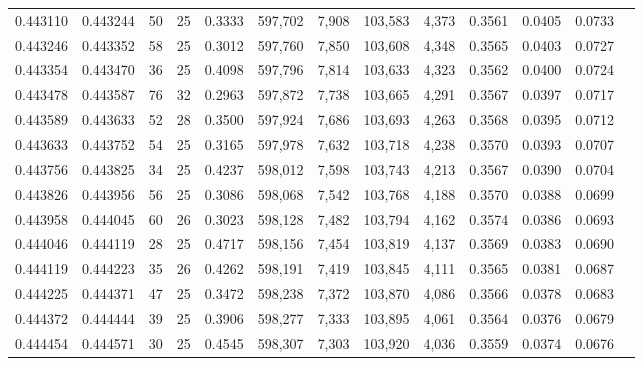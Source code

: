 \begin{tabular}{rrrrrrrrrrrrr}
0.443110 & 0.443244 &    50 &  25 &                                     0.3333 & 597,702 &   7,908 & 103,583 &   4,373 & 0.3561 & 0.0405 & 0.0733 \\
0.443246 & 0.443352 &    58 &  25 &                                     0.3012 & 597,760 &   7,850 & 103,608 &   4,348 & 0.3565 & 0.0403 & 0.0727 \\
0.443354 & 0.443470 &    36 &  25 &                                     0.4098 & 597,796 &   7,814 & 103,633 &   4,323 & 0.3562 & 0.0400 & 0.0724 \\
0.443478 & 0.443587 &    76 &  32 &                                     0.2963 & 597,872 &   7,738 & 103,665 &   4,291 & 0.3567 & 0.0397 & 0.0717 \\
0.443589 & 0.443633 &    52 &  28 &                                     0.3500 & 597,924 &   7,686 & 103,693 &   4,263 & 0.3568 & 0.0395 & 0.0712 \\
0.443633 & 0.443752 &    54 &  25 &                                     0.3165 & 597,978 &   7,632 & 103,718 &   4,238 & 0.3570 & 0.0393 & 0.0707 \\
0.443756 & 0.443825 &    34 &  25 &                                     0.4237 & 598,012 &   7,598 & 103,743 &   4,213 & 0.3567 & 0.0390 & 0.0704 \\
0.443826 & 0.443956 &    56 &  25 &                                     0.3086 & 598,068 &   7,542 & 103,768 &   4,188 & 0.3570 & 0.0388 & 0.0699 \\
0.443958 & 0.444045 &    60 &  26 &                                     0.3023 & 598,128 &   7,482 & 103,794 &   4,162 & 0.3574 & 0.0386 & 0.0693 \\
0.444046 & 0.444119 &    28 &  25 &                                     0.4717 & 598,156 &   7,454 & 103,819 &   4,137 & 0.3569 & 0.0383 & 0.0690 \\
0.444119 & 0.444223 &    35 &  26 &                                     0.4262 & 598,191 &   7,419 & 103,845 &   4,111 & 0.3565 & 0.0381 & 0.0687 \\
0.444225 & 0.444371 &    47 &  25 &                                     0.3472 & 598,238 &   7,372 & 103,870 &   4,086 & 0.3566 & 0.0378 & 0.0683 \\
0.444372 & 0.444444 &    39 &  25 &                                     0.3906 & 598,277 &   7,333 & 103,895 &   4,061 & 0.3564 & 0.0376 & 0.0679 \\
0.444454 & 0.444571 &    30 &  25 &                                     0.4545 & 598,307 &   7,303 & 103,920 &   4,036 & 0.3559 & 0.0374 & 0.0676 \\

\end{tabular}
